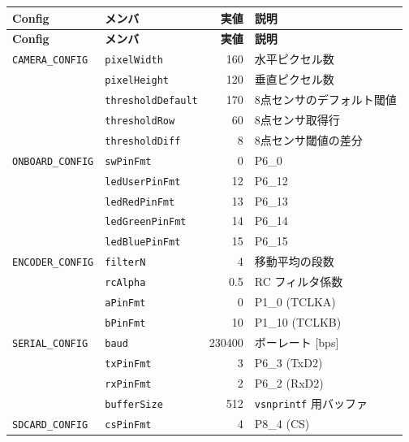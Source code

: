 \documentclass[a4paper,11pt,dvipdfmx]{jsarticle}
\begin{document}
\begin{longtable}{l l r p{62mm}}
\toprule
\textbf{Config} & \textbf{メンバ} & \textbf{実値} & \textbf{説明} \\
\midrule
\endfirsthead
\toprule
\textbf{Config} & \textbf{メンバ} & \textbf{実値} & \textbf{説明} \\
\midrule
\endhead
\texttt{CAMERA\_CONFIG}   & \texttt{pixelWidth}       & 160    & 水平ピクセル数 \\
                          & \texttt{pixelHeight}      & 120    & 垂直ピクセル数 \\
                          & \texttt{thresholdDefault} & 170    & 8点センサのデフォルト閾値 \\
                          & \texttt{thresholdRow}     & 60     & 8点センサ取得行 \\
                          & \texttt{thresholdDiff}    & 8      & 8点センサ閾値の差分 \\
\midrule
\texttt{ONBOARD\_CONFIG}  & \texttt{swPinFmt}         & 0      & P6\_0 \\
                          & \texttt{ledUserPinFmt}    & 12     & P6\_12 \\
                          & \texttt{ledRedPinFmt}     & 13     & P6\_13 \\
                          & \texttt{ledGreenPinFmt}   & 14     & P6\_14 \\
                          & \texttt{ledBluePinFmt}    & 15     & P6\_15 \\
\midrule
\texttt{ENCODER\_CONFIG}  & \texttt{filterN}          & 4      & 移動平均の段数 \\
                          & \texttt{rcAlpha}          & 0.5    & RC フィルタ係数 \\
                          & \texttt{aPinFmt}          & 0      & P1\_0 (TCLKA) \\
                          & \texttt{bPinFmt}          & 10     & P1\_10 (TCLKB) \\
\midrule
\texttt{SERIAL\_CONFIG}   & \texttt{baud}             & 230400 & ボーレート [bps] \\
                          & \texttt{txPinFmt}         & 3      & P6\_3 (TxD2) \\
                          & \texttt{rxPinFmt}         & 2      & P6\_2 (RxD2) \\
                          & \texttt{bufferSize}       & 512    & \texttt{vsnprintf} 用バッファ \\
\midrule
\texttt{SDCARD\_CONFIG}   & \texttt{csPinFmt}         & 4      & P8\_4 (CS) \\

\end{longtable}
\end{document}
